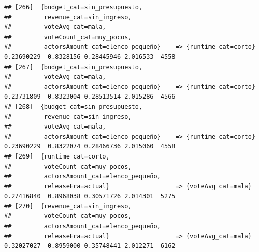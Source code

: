 \documentclass[
]{article}
\begin{document}
\begin{verbatim}
## [266]  {budget_cat=sin_presupuesto,                                                                                             
##         revenue_cat=sin_ingreso,                                                                                                
##         voteAvg_cat=mala,                                                                                                       
##         voteCount_cat=muy_pocos,                                                                                                
##         actorsAmount_cat=elenco_pequeño}    => {runtime_cat=corto}               0.23690229  0.8328156 0.28445946 2.016533  4558
## [267]  {budget_cat=sin_presupuesto,                                                                                             
##         voteAvg_cat=mala,                                                                                                       
##         actorsAmount_cat=elenco_pequeño}    => {runtime_cat=corto}               0.23731809  0.8323004 0.28513514 2.015286  4566
## [268]  {budget_cat=sin_presupuesto,                                                                                             
##         revenue_cat=sin_ingreso,                                                                                                
##         voteAvg_cat=mala,                                                                                                       
##         actorsAmount_cat=elenco_pequeño}    => {runtime_cat=corto}               0.23690229  0.8322074 0.28466736 2.015060  4558
## [269]  {runtime_cat=corto,                                                                                                      
##         voteCount_cat=muy_pocos,                                                                                                
##         actorsAmount_cat=elenco_pequeño,                                                                                        
##         releaseEra=actual}                  => {voteAvg_cat=mala}                0.27416840  0.8968038 0.30571726 2.014301  5275
## [270]  {revenue_cat=sin_ingreso,                                                                                                
##         voteCount_cat=muy_pocos,                                                                                                
##         actorsAmount_cat=elenco_pequeño,                                                                                        
##         releaseEra=actual}                  => {voteAvg_cat=mala}                0.32027027  0.8959000 0.35748441 2.012271  6162

\end{verbatim}
\end{document}
